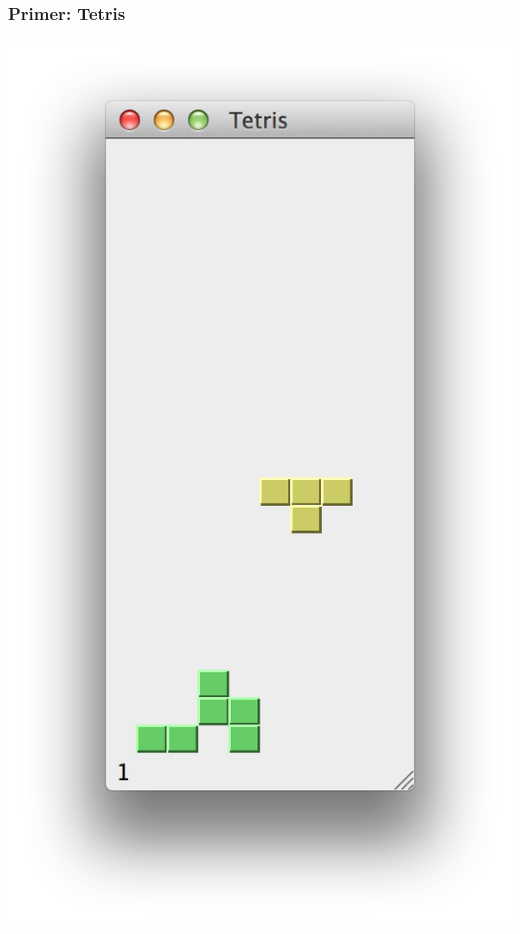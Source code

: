 \documentclass[utf8,compress]{beamer}
\begin{document}
\begin{frame}[fragile]
  \frametitle{Primer: Tetris}
\begin{center}
\includegraphics[scale=0.45]{pyqt18.png}
\end{center}
\end{frame}
\end{document}
